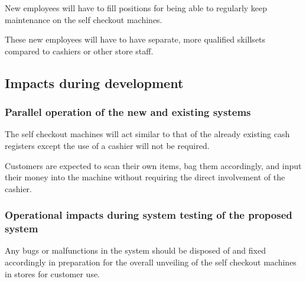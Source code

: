 New employees will have to fill positions for being able to regularly 
keep maintenance on the self checkout machines. \newline

\noindent
These new employees will have to have separate, more qualified skillsets 
compared to cashiers or other store staff.

\pagebreak

\subsection{Impacts during development}
\subsubsection{Parallel operation of the new and existing systems}
The self checkout machines will act similar to that of the already existing 
cash registers except the use of a cashier will not be required. \newline

\noindent
Customers are expected to scan their own items, bag them accordingly, and 
input their money into the machine without requiring the direct involvement 
of the cashier.

\subsubsection{Operational impacts during system testing of the proposed system}
Any bugs or malfunctions in the system should be disposed of and fixed 
accordingly in preparation for the overall unveiling of the self checkout 
machines in stores for customer use.